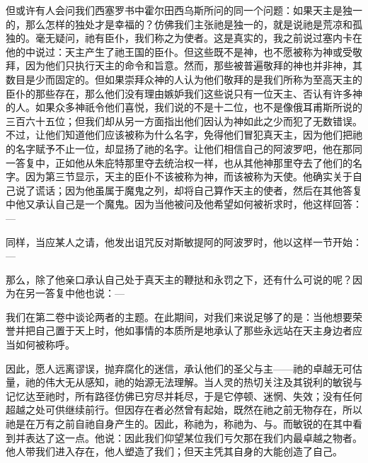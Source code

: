 但或许有人会问我们西塞罗书中霍尔田西乌斯所问的同一个问题：如果天主是独一的，那么怎样的独处才是幸福的？仿佛我们主张祂是独一的，就是说祂是荒凉和孤独的。毫无疑问，祂有臣仆，我们称之为使者。这是真实的，我之前说过塞内卡在他的中说过：天主产生了祂王国的臣仆。但这些既不是神，也不愿被称为神或受敬拜，因为他们只执行天主的命令和旨意。然而，那些被普遍敬拜的神也并非神，其数目是少而固定的。但如果崇拜众神的人认为他们敬拜的是我们所称为至高天主的臣仆的那些存在，那么他们没有理由嫉妒我们这些说只有一位天主、否认有许多神的人。如果众多神祇令他们喜悦，我们说的不是十二位，也不是像俄耳甫斯所说的三百六十五位；但我们却从另一方面指出他们因认为神如此之少而犯了无数错误。不过，让他们知道他们应该被称为什么名字，免得他们冒犯真天主，因为他们把祂的名字赋予不止一位，却显扬了祂的名字。让他们相信自己的阿波罗吧，他在那同一答复中，正如他从朱庇特那里夺去统治权一样，也从其他神那里夺去了他们的名字。因为第三节显示，天主的臣仆不该被称为神，而该被称为天使。他确实关于自己说了谎话；因为他虽属于魔鬼之列，却将自己算作天主的使者，然后在其他答复中他又承认自己是一个魔鬼。因为当他被问及他希望如何被祈求时，他这样回答：—\par

\par

同样，当应某人之请，他发出诅咒反对斯敏提阿的阿波罗时，他以这样一节开始：—\par

\par

那么，除了他亲口承认自己处于真天主的鞭挞和永罚之下，还有什么可说的呢？因为在另一答复中他也说：—\par

\par

我们在第二卷中谈论两者的主题。在此期间，对我们来说足够了的是：当他想要荣誉并把自己置于天上时，他如事情的本质所是地承认了那些永远站在天主身边者应当如何被称呼。\par

因此，愿人远离谬误，抛弃腐化的迷信，承认他们的圣父与主——祂的卓越无可估量，祂的伟大无从感知，祂的始源无法理解。当人灵的热切关注及其锐利的敏锐与记忆达至祂时，所有路径仿佛已穷尽并耗尽，于是它停顿、迷惘、失效；没有任何超越之处可供继续前行。但因存在者必然曾有起始，既然在祂之前无物存在，所以祂是在万有之前自祂自身产生的。因此，称祂为，称祂为、与。而敏锐的在其中看到并表达了这一点。他说：因此我们仰望某位我们亏欠那在我们内最卓越之物者。他人带我们进入存在，他人塑造了我们；但天主凭其自身的大能创造了自己。\par

